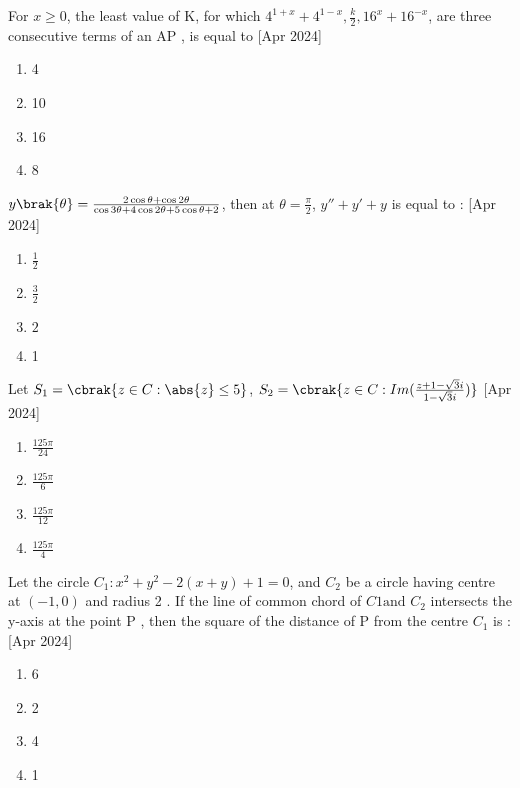     \item For $x\geq 0$, the least value of K, for which $4^{1+x} +4^{1-x}, \frac{k}{2}, 16^x +16^{-x}$, are three consecutive terms of an AP , is equal to
     \hfill{[Apr 2024]}
\begin{multicols}{4}
            \begin{enumerate}
              \item 4
              \item 10
              \item 16
              \item 8
            \end{enumerate}
        \end{multicols}
    \item $y\brak{\theta}=\frac{2\cos{\theta}+\cos{2\theta}}{\cos{3\theta}+4\cos{2\theta}+5\cos{\theta}+2}$, then at $\theta=\frac{\pi}{2}$, $y''+y'+y$ is equal to :
     \hfill{[Apr 2024]}
    \begin{multicols}{4}
            \begin{enumerate}
              \item $\frac{1}{2}$
              \item $\frac{3}{2}$
              \item $2$
              \item 1
            \end{enumerate}
        \end{multicols}
    \item Let $S_1=\cbrak{z \in C: \abs{z}\leq 5}$, $S_2=\cbrak{z \in C :Im(\frac{z+1-\sqrt{3}i}{1-\sqrt{3}i})}$
     \hfill{[Apr 2024]}
    \begin{multicols}{4}
            \begin{enumerate}
              \item $\frac{125\pi}{24}$
              \item $\frac{125\pi}{6}$
              \item $\frac{125\pi}{12}$
              \item $\frac{125\pi}{4}$
            \end{enumerate}
        \end{multicols}
     
    \item Let the circle $C_1: x^2+y^2-2(x+y)+1=0$, and $C_2$ be a circle having centre at $(-1,0)$ and radius 2 . If the line of common chord of $C1 \text{and } C_2$ intersects the y-axis at the point P , then the square of the distance of P from the centre $C_1$ is :
      \hfill{[Apr 2024]}
    \begin{multicols}{4}
            \begin{enumerate}
              \item 6
              \item 2
              \item 4
              \item 1
            \end{enumerate}
        \end{multicols}
    
